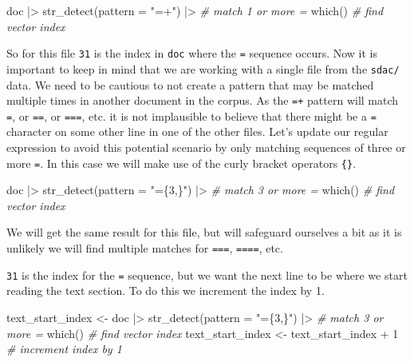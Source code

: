 \documentclass[
  letterpaper,
  DIV=11,
  numbers=noendperiod]{scrreport}
\newenvironment{Shaded}{\begin{snugshade}}{\end{snugshade}}
\newcommand{\AttributeTok}[1]{\textcolor[rgb]{0.00,0.00,0.00}{#1}}
\newcommand{\CommentTok}[1]{\textcolor[rgb]{0.00,0.00,0.00}{\textit{#1}}}
\newcommand{\DecValTok}[1]{\textcolor[rgb]{0.00,0.00,0.00}{#1}}
\newcommand{\FunctionTok}[1]{\textcolor[rgb]{0.00,0.00,0.00}{#1}}
\newcommand{\NormalTok}[1]{\textcolor[rgb]{0.00,0.00,0.00}{#1}}
\newcommand{\OtherTok}[1]{\textcolor[rgb]{0.00,0.00,0.00}{#1}}
\newcommand{\SpecialCharTok}[1]{\textcolor[rgb]{0.00,0.00,0.00}{#1}}
\newcommand{\StringTok}[1]{\textcolor[rgb]{0.00,0.00,0.00}{#1}}
\theoremstyle{definition}
\theoremstyle{remark}
\begin{document}
\begin{Shaded}
\begin{Highlighting}[]
\NormalTok{doc }\SpecialCharTok{|\textgreater{}} 
  \FunctionTok{str\_detect}\NormalTok{(}\AttributeTok{pattern =} \StringTok{"=+"}\NormalTok{) }\SpecialCharTok{|\textgreater{}} \CommentTok{\# match 1 or more \textasciigrave{}=\textasciigrave{}}
  \FunctionTok{which}\NormalTok{() }\CommentTok{\# find vector index}
\end{Highlighting}
\end{Shaded}

So for this file \texttt{31} is the index in \texttt{doc} where the
\texttt{=} sequence occurs. Now it is important to keep in mind that we
are working with a single file from the \texttt{sdac/} data. We need to
be cautious to not create a pattern that may be matched multiple times
in another document in the corpus. As the \texttt{=+} pattern will match
\texttt{=}, or \texttt{==}, or \texttt{===}, etc. it is not implausible
to believe that there might be a \texttt{=} character on some other line
in one of the other files. Let's update our regular expression to avoid
this potential scenario by only matching sequences of three or more
\texttt{=}. In this case we will make use of the curly bracket operators
\texttt{\{\}}.

\begin{Shaded}
\begin{Highlighting}[]
\NormalTok{doc }\SpecialCharTok{|\textgreater{}} 
  \FunctionTok{str\_detect}\NormalTok{(}\AttributeTok{pattern =} \StringTok{"=\{3,\}"}\NormalTok{) }\SpecialCharTok{|\textgreater{}} \CommentTok{\# match 3 or more \textasciigrave{}=\textasciigrave{}}
  \FunctionTok{which}\NormalTok{() }\CommentTok{\# find vector index}
\end{Highlighting}
\end{Shaded}

We will get the same result for this file, but will safeguard ourselves
a bit as it is unlikely we will find multiple matches for \texttt{===},
\texttt{====}, etc.

\texttt{31} is the index for the \texttt{=} sequence, but we want the
next line to be where we start reading the text section. To do this we
increment the index by 1.

\begin{Shaded}
\begin{Highlighting}[]
\NormalTok{text\_start\_index }\OtherTok{\textless{}{-}} 
\NormalTok{  doc }\SpecialCharTok{|\textgreater{}} 
  \FunctionTok{str\_detect}\NormalTok{(}\AttributeTok{pattern =} \StringTok{"=\{3,\}"}\NormalTok{) }\SpecialCharTok{|\textgreater{}} \CommentTok{\# match 3 or more \textasciigrave{}=\textasciigrave{} }
  \FunctionTok{which}\NormalTok{() }\CommentTok{\# find vector index}
\NormalTok{text\_start\_index }\OtherTok{\textless{}{-}}\NormalTok{ text\_start\_index }\SpecialCharTok{+} \DecValTok{1} \CommentTok{\# increment index by 1}
\end{Highlighting}
\end{Shaded}
\end{document}
